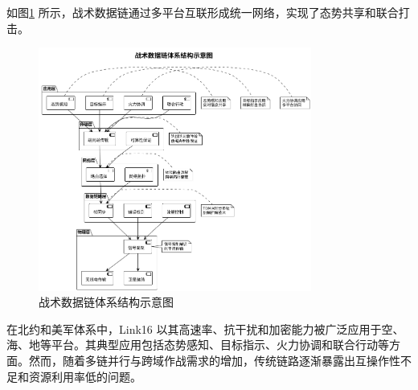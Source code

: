 \begin{table}[!htb]
    \caption{典型战术数据链对比}
    \label{table_tdl_compare}
    \centering
\end{table}

如图\ref{fig_tdl_architecture} 所示，战术数据链通过多平台互联形成统一网络，实现了态势共享和联合打击。

\begin{figure}[!htb]
    \centering
    \includegraphics[width=0.8\textwidth,height=0.5\textheight,keepaspectratio]{chapters/fig-0/tdl_architecture_simple.png}
    \caption{战术数据链体系结构示意图}
    \label{fig_tdl_architecture}
\end{figure}

在北约和美军体系中，{Link16} 以其高速率、抗干扰和加密能力被广泛应用于空、海、地等平台\cite{Ultra_ADSI_2023}。其典型应用包括态势感知、目标指示、火力协调和联合行动等方面。然而，随着多链并行与跨域作战需求的增加，传统链路逐渐暴露出互操作性不足和资源利用率低的问题。

